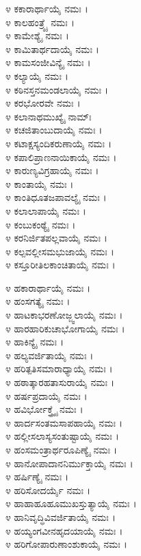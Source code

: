 
೪ ಕಕಾರಾರ್ಥಾಯೈ ನಮಃ ।\\
೪ ಕಾಲಹಂತ್ರ್ಯೈ ನಮಃ ।\\
೪ ಕಾಮೇಶ್ಯೈ ನಮಃ ।\\
೪ ಕಾಮಿತಾರ್ಥದಾಯೈ ನಮಃ ।\\
೪ ಕಾಮಸಂಜೀವಿನ್ಯೈ ನಮಃ ।\\
೪ ಕಲ್ಯಾಯೈ ನಮಃ ।\\
೪ ಕಠಿನಸ್ತನಮಂಡಲಾಯೈ ನಮಃ ।\\
೪ ಕರಭೋರವೇ ನಮಃ ।\\
೪ ಕಲಾನಾಥಮುಖ್ಯೈ ನಾಮ್ಃ\\
೪ ಕಚಜಿತಾಂಬುದಾಯೈ ನಮಃ ।\\
೪ ಕಟಾಕ್ಷಸ್ಯಂದಿಕರುಣಾಯೈ ನಮಃ ।\\
೪ ಕಪಾಲಿಪ್ರಾಣನಾಯಿಕಾಯೈ ನಮಃ ।\\
೪ ಕಾರುಣ್ಯವಿಗ್ರಹಾಯೈ ನಮಃ ।\\
೪ ಕಾಂತಾಯೈ ನಮಃ ।\\
೪ ಕಾಂತಿಧೂತಜಪಾವಲ್ಯೈ ನಮಃ ।\\
೪ ಕಲಾಲಾಪಾಯೈ ನಮಃ ।\\
೪ ಕಂಬುಕಂಠ್ಯೈ ನಮಃ ।\\
೪ ಕರನಿರ್ಜಿತಪಲ್ಲವಾಯೈ ನಮಃ ।\\
೪ ಕಲ್ಪವಲ್ಲೀಸಮಭುಜಾಯೈ ನಮಃ ।\\
೪ ಕಸ್ತೂರೀತಿಲಕಾಂಚಿತಾಯೈ ನಮಃ ।


೪ ಹಕಾರಾರ್ಥಾಯೈ ನಮಃ ।\\
೪ ಹಂಸಗತ್ಯೈ ನಮಃ ।\\
೪ ಹಾಟಕಾಭರಣೋಜ್ಜ್ವಲಾಯೈ ನಮಃ ।\\
೪ ಹಾರಹಾರಿಕುಚಾಭೋಗಾಯೈ ನಮಃ ।\\
೪ ಹಾಕಿನ್ಯೈ ನಮಃ ।\\
೪ ಹಲ್ಯವರ್ಜಿತಾಯೈ ನಮಃ ।\\
೪ ಹರಿತ್ಪತಿಸಮಾರಾಧ್ಯಾಯೈ ನಮಃ ।\\
೪ ಹಠಾತ್ಕಾರಹತಾಸುರಾಯೈ ನಮಃ ।\\
೪ ಹರ್ಷಪ್ರದಾಯೈ ನಮಃ ।\\
೪ ಹವಿರ್ಭೋಕ್ತ್ರ್ಯೈ ನಮಃ ।\\
೪ ಹಾರ್ದಸಂತಮಸಾಪಹಾಯೈ ನಮಃ ।\\
೪ ಹಲ್ಲೀಸಲಾಸ್ಯಸಂತುಷ್ಟಾಯೈ ನಮಃ ।\\
೪ ಹಂಸಮಂತ್ರಾರ್ಥರೂಪಿಣ್ಯೈ ನಮಃ ।\\
೪ ಹಾನೋಪಾದಾನನಿರ್ಮುಕ್ತಾಯೈ ನಮಃ ।\\
೪ ಹರ್ಷಿಣ್ಯೈ ನಮಃ ।\\
೪ ಹರಿಸೋದರ್ಯೈ ನಮಃ ।\\
೪ ಹಾಹಾಹೂಹೂಮುಖಸ್ತುತ್ಯಾಯೈ ನಮಃ ।\\
೪ ಹಾನಿವೃದ್ಧಿವಿವರ್ಜಿತಾಯೈ ನಮಃ ।\\
೪ ಹಯ್ಯಂಗವೀನಹೃದಯಾಯೈ ನಮಃ ।\\
೪ ಹರಿಗೋಪಾರುಣಾಂಶುಕಾಯೈ ನಮಃ ।

